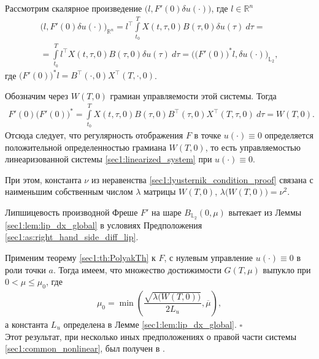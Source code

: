\documentclass[../main.tex]{subfiles}
\begin{document}
Рассмотрим скалярное произведение $ \Big(l,  F'(0) \delta u(\cdot)\Big) $, где $ l \in \mathbb{R}^n$
\begin{gather*}
	\Big(l,  F'(0) \delta u(\cdot)\Big)_{\mathbb{R}^n} =
	 l^{\top}  \int\limits_{t_0}^{T} X(t, \tau, 0) B(\tau, 0) \delta u(\tau) \ d\tau = \\ = 
	  \int\limits_{t_0}^{T} l^{\top} X(t, \tau, 0) B(\tau, 0)  \delta u(\tau) \ d\tau =
	   \Big(\big(F'(0)\big)^* l,  \delta u(\cdot)\Big)_{\mathbb{L}_2},
\end{gather*}
где $ \big(F'(0)\big)^* l =  B^{\top} (\cdot, 0) X^{\top}(T, \cdot, 0)$.

Обозначим через  $W(T,0) $ грамиан управляемости этой системы.
Тогда 
\begin{gather}
    F'(0) \big(F'(0)\big)^* = \int\limits_{t_0}^{T} X(t, \tau, 0) B(\tau, 0) B^{\top} (\tau, 0) X^{\top}(T, \tau, 0) \ d\tau= W(T,0).
\end{gather}
Отсюда следует, что  регулярность отображения  $F$ в точке $u(\cdot) \equiv 0$ определяется положительной определенностью грамиана  $W(T,0) $, то есть управляемостью линеаризованной системы \eqref{sec1:linearized_system} при $u(\cdot) \equiv 0$. 

При этом, константа $\nu$ из неравенства \eqref{sec1:lyusternik_condition_proof} связана с наименьшим собственным числом $\lambda$ матрицы $W(T,0) $,  $\lambda\big(W(T,0)\big) = \nu^2$.
    
Липшицевость производной Фреше $F'$ на шаре $B_{\mathbb{L}_2}(0,\mu)$ вытекает из Леммы \ref{sec1:lem:lip_dx_global} в условиях Предположения \ref{sec1:as:right_hand_side_diff_lip}. 
    
Применим теорему \ref{sec1:th:PolyakTh} к $F$, с нулевым управление $u(\cdot) \equiv 0$ в роли точки $a$. 
Тогда имеем, что множество достижимости $G(T,\mu)$ выпукло при $ 0 < \mu \leqslant \mu_0 $, где  
\begin{gather}\label{sec1:mu0}
    \mu_0 = \min\left( \dfrac{\sqrt{\lambda\big(W(T,0)\big)}}{2L_u}, \overline{\mu} \right), 
\end{gather}
а константа $L_u $ определена в Лемме  \ref{sec1:lem:lip_dx_global}. 
\hfill$\square$\\[1ex]%
Этот результат, при несколько иных предположениях о правой части системы \eqref{sec1:common_nonlinear}, был получен в \cite{Polyak2004}.
    
\end{document}
